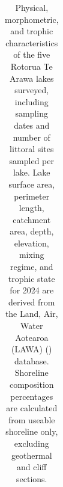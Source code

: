 \documentclass[
  letterpaper,
  DIV=11,
  numbers=noendperiod]{scrartcl}
\begin{document}
{

\begin{longtable}[]{@{}
  >{\raggedright\arraybackslash}p{}
  >{\raggedright\arraybackslash}p{}
  >{\raggedleft\arraybackslash}p{}
  >{\raggedleft\arraybackslash}p{}
  >{\raggedleft\arraybackslash}p{}
  >{\raggedleft\arraybackslash}p{}
  >{\raggedleft\arraybackslash}p{}
  >{\raggedleft\arraybackslash}p{}
  >{\raggedright\arraybackslash}p{}
  >{\raggedright\arraybackslash}p{}
  >{\raggedleft\arraybackslash}p{}
  >{\raggedleft\arraybackslash}p{}
  >{\raggedleft\arraybackslash}p{}
  >{\raggedleft\arraybackslash}p{}@{}}

\caption{\label{tbl-lake-overview-ms}Physical, morphometric, and trophic
characteristics of the five Rotorua Te Arawa lakes surveyed, including
sampling dates and number of littoral sites sampled per lake. Lake
surface area, perimeter length, catchment area, depth, elevation, mixing
regime, and trophic state for 2024 are derived from the Land, Air, Water
Aotearoa (LAWA) () database. Shoreline
composition percentages are calculated from useable shoreline only,
excluding geothermal and cliff sections.}

\tabularnewline


\end{longtable}}
\end{document}
